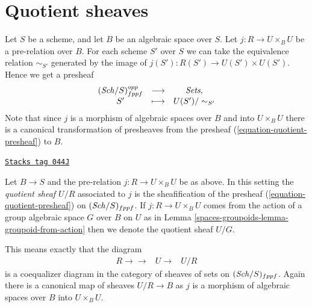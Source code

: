 \section{Quotient sheaves}
\label{spaces-groupoids-section-quotient-sheaves}
Let $S$ be a scheme, and let $B$ be an algebraic space over $S$.
Let $j : R \to U \times_B U$ be a pre-relation over $B$.
For each scheme $S'$ over $S$ we can take the equivalence relation
$\sim_{S'}$ generated by the image of $j(S') : R(S') \to U(S') \times U(S')$.
Hence we get a presheaf
\begin{equation}
\label{equation-quotient-presheaf}
\begin{matrix}
(\mathit{Sch}/S)^{opp}_{fppf} &
\longrightarrow &
\textit{Sets}, \\
S' &
\longmapsto  &
U(S')/\sim_{S'}
\end{matrix}
\end{equation}
Note that since $j$ is a morphism of algebraic spaces over $B$
and into $U \times_B U$ there is a canonical transformation of
presheaves from the presheaf (\ref{equation-quotient-presheaf}) to $B$.

\begin{definition}
\label{spaces-groupoids-definition-quotient-sheaf}
\href{https://stacks.math.columbia.edu/tag/044J}{\texttt{Stacks tag 044J}}

Let $B \to S$ and the pre-relation $j : R \to U \times_B U$ be as above.
In this setting the {\it quotient sheaf $U/R$} associated
to $j$ is the sheafification of the presheaf
(\ref{equation-quotient-presheaf}) on $(\mathit{Sch}/S)_{fppf}$.
If $j : R \to U \times_B U$ comes from the action of a
group algebraic space $G$ over $B$ on $U$ as in
Lemma \ref{spaces-groupoids-lemma-groupoid-from-action}
then we denote the quotient sheaf $U/G$.
\end{definition}

This means exactly that the diagram
$$
\begin{array}{ccc}R \longrightarrow\longrightarrow & U \longrightarrow & U/R\end{array}
$$
is a coequalizer diagram in the category of sheaves of sets
on $(\mathit{Sch}/S)_{fppf}$. Again there is a canonical map
of sheaves $U/R \to B$ as $j$ is a morphism of algebraic spaces over
$B$ into $U \times_B U$.

